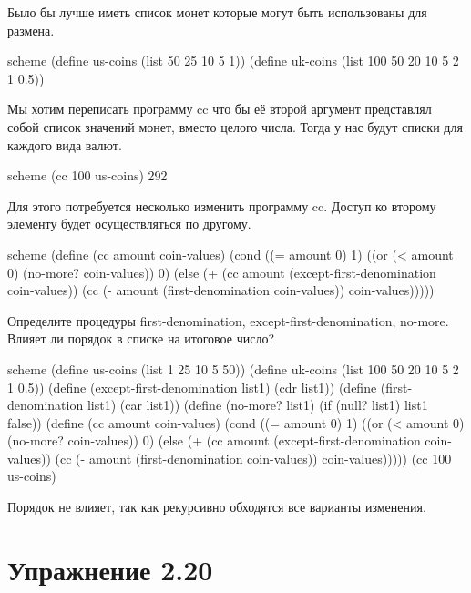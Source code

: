 Было бы лучше иметь список монет которые могут быть использованы для размена.

\begin{codelisting}{scheme}
(define us-coins (list 50 25 10 5 1))
(define uk-coins (list 100 50 20 10 5 2 1 0.5))
\end{codelisting}

Мы хотим переписать программу cc что бы её второй аргумент представлял собой список значений монет, вместо целого числа. Тогда у нас будут списки для каждого вида валют.

\begin{codelisting}{scheme}
(cc 100 us-coins)
292
\end{codelisting}

Для этого потребуется несколько изменить программу cc. Доступ ко второму элементу будет осуществляться по другому.

\begin{codelisting}{scheme}
(define (cc amount coin-values)
  (cond ((= amount 0) 1)
        ((or (< amount 0) (no-more? coin-values)) 0)
        (else
         (+ (cc amount
                (except-first-denomination coin-values))
            (cc (- amount
                   (first-denomination coin-values))
                coin-values)))))
\end{codelisting}

Определите процедуры first-denomination, except-first-denomination, no-more. Влияет ли порядок в списке на итоговое число?

\begin{codelisting}{scheme}
(define us-coins (list 1 25 10 5 50))
(define uk-coins (list 100 50 20 10 5 2 1 0.5))
(define (except-first-denomination list1)
  (cdr list1))
(define (first-denomination list1)
  (car list1))
(define (no-more? list1)
  (if (null? list1)
      list1
      false))
(define (cc amount coin-values)
  (cond ((= amount 0) 1)
        ((or (< amount 0) (no-more? coin-values)) 0)
        (else
         (+ (cc amount
                (except-first-denomination coin-values))
            (cc (- amount
                   (first-denomination coin-values))
                coin-values)))))
(cc 100 us-coins)
\end{codelisting}

Порядок не влияет, так как рекурсивно обходятся все варианты изменения.


\chapter{Упражнение 2.20}

